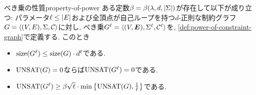 \begin{lemma}{べき乗の性質}{property-of-power}
  ある定数$\beta=\beta(\lambda,d,\abs{\Sigma})$が存在して以下が成り立つ:
  パラメータ$\ell \le \abs{E}$および全頂点が自己ループを持つ$d$-正則な制約グラフ$G=\langle(V,E),\Sigma,\mathcal{C}\rangle$に対し, べき乗$G^\ell = \langle(V,\boldsymbol{E}),\Sigma^{\ell},\mathcal{C}^\ell\rangle$を, \cref{def:power-of-constraint-graph}で定義する.
  このとき
  \begin{itemize}
    \item $\mathrm{size}(G^\ell) \le \mathrm{size}(G)\cdot d^\ell$である.
    \item $\mathrm{UNSAT}(G)=0$ならば$\mathrm{UNSAT}(G^\ell)=0$である.
    \item $\mathrm{UNSAT}(G^\ell) \ge \beta\sqrt{\ell}\cdot \min\qty{ \mathrm{UNSAT}(G), \frac{1}{\ell} }$である.
  \end{itemize}
\end{lemma}

